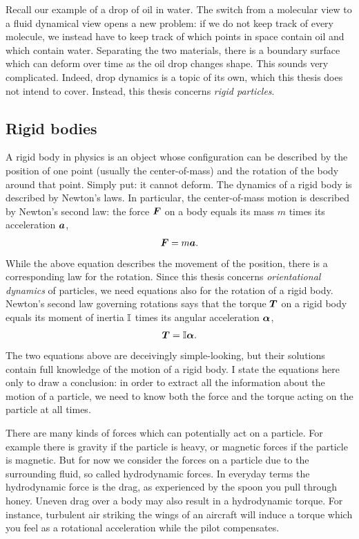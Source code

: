 \documentclass[thesis.tex]{subfiles}
\begin{document}
Recall our example of a drop of oil in water. The switch from a molecular view to a fluid dynamical view opens a new problem: if we do not keep track of every molecule, we instead have to keep track of which points in space contain oil and which contain water. Separating the two materials, there is a boundary surface which can deform over time as the oil drop changes shape. This sounds very complicated. Indeed, drop dynamics is a topic of its own, which this thesis does not intend to cover. Instead, this thesis concerns \emph{rigid particles}.

\subsection*{Rigid bodies}

A rigid body in physics is an object whose configuration can be described by the position of one point (usually the center-of-mass) and the rotation of the body around that point. Simply put: it cannot deform. The dynamics of a rigid body is described by Newton's laws. In particular, the center-of-mass motion is described by Newton's second law: the force $\mbox{\boldmath$F$}$ on a body equals its mass $m$ times its acceleration $\mbox{\boldmath$a$}$,
\begin{align*}
	\mbox{\boldmath$F$} = m\mbox{\boldmath$a$}.
\end{align*}
While the above equation describes the movement of the position, there is a corresponding law for the rotation. Since this thesis concerns \emph{orientational dynamics} of particles, we need equations also for the rotation of a rigid body. Newton's second law governing rotations says that the torque $\mbox{\boldmath$T$}$ on a rigid body equals its moment of inertia $\mathbb{I}$ times its angular acceleration $\mbox{\boldmath$\alpha$}$,
\begin{align*}
	\mbox{\boldmath$T$} = \mathbb{I} \mbox{\boldmath$\alpha$}.
\end{align*}
The two equations above are deceivingly simple-looking, but their solutions contain full knowledge of the motion of a rigid body. I state the equations here only to draw a conclusion: in order to extract all the information about the motion of a particle, we need to know both the force and the torque acting on the particle at all times.

There are many kinds of forces which can potentially act on a particle. For example there is gravity if the particle is heavy, or magnetic forces if the particle is magnetic. But for now we consider the forces on a particle due to the surrounding fluid, so called hydrodynamic forces. In everyday terms the hydrodynamic force is the drag, as experienced by the spoon you pull through honey. Uneven drag over a body may also result in a hydrodynamic torque. For instance, turbulent air striking the wings of an aircraft will induce a torque which you feel as a rotational acceleration while the pilot compensates.
\end{document}
